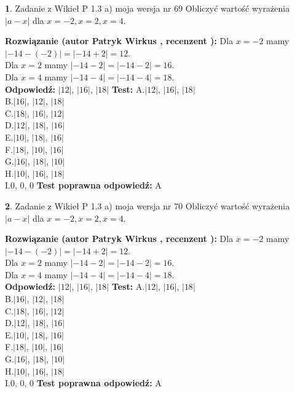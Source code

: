 \documentclass[12pt, a4paper]{article}
\theoremstyle{definition} %
\newtheorem{zad}{}
\newcommand{\zadStart}[1]{\begin{zad}#1\newline}
\newcommand{\zadStop}{\end{zad}}
\newcommand{\rozwStart}[2]{\noindent \textbf{Rozwiązanie (autor #1 , recenzent #2): }\newline}
\newcommand{\rozwStop}{\newline}
\newcommand{\odpStart}{\noindent \textbf{Odpowiedź:}\newline}
\newcommand{\odpStop}{\newline}
\newcommand{\testStart}{\noindent \textbf{Test:}\newline}
\newcommand{\testStop}{\newline}
\newcommand{\kluczStart}{\noindent \textbf{Test poprawna odpowiedź:}\newline}
\newcommand{\kluczStop}{\newline}
\begin{document}
\zadStart{Zadanie z Wikieł P 1.3 a) moja wersja nr 69}
Obliczyć wartość wyrażenia $|a - x|$ dla $x=-2,x=2,x=4$.
\zadStop
\rozwStart{Patryk Wirkus}{}
Dla $x = -2$ mamy $|-14 - (-2)| = |-14 + 2| = 12$.\\
Dla $x = 2$ mamy $|-14 - 2| = |-14 - 2| = 16$.\\
Dla $x = 4$ mamy $|-14 - 4| = |-14 - 4| = 18$.\\
\rozwStop
\odpStart
$|12|$, $|16|$, $|18|$
\odpStop
\testStart
A.$|12|$, $|16|$, $|18|$\\
B.$|16|$, $|12|$, $|18|$\\
C.$|18|$, $|16|$, $|12|$\\
D.$|12|$, $|18|$, $|16|$\\
E.$|10|$, $|18|$, $|16|$\\
F.$|18|$, $|10|$, $|16|$\\
G.$|16|$, $|18|$, $|10|$\\
H.$|10|$, $|16|$, $|18|$\\
I.$0$, $0$, $0$
\testStop
\kluczStart
A
\kluczStop



\zadStart{Zadanie z Wikieł P 1.3 a) moja wersja nr 70}
Obliczyć wartość wyrażenia $|a - x|$ dla $x=-2,x=2,x=4$.
\zadStop
\rozwStart{Patryk Wirkus}{}
Dla $x = -2$ mamy $|-14 - (-2)| = |-14 + 2| = 12$.\\
Dla $x = 2$ mamy $|-14 - 2| = |-14 - 2| = 16$.\\
Dla $x = 4$ mamy $|-14 - 4| = |-14 - 4| = 18$.\\
\rozwStop
\odpStart
$|12|$, $|16|$, $|18|$
\odpStop
\testStart
A.$|12|$, $|16|$, $|18|$\\
B.$|16|$, $|12|$, $|18|$\\
C.$|18|$, $|16|$, $|12|$\\
D.$|12|$, $|18|$, $|16|$\\
E.$|10|$, $|18|$, $|16|$\\
F.$|18|$, $|10|$, $|16|$\\
G.$|16|$, $|18|$, $|10|$\\
H.$|10|$, $|16|$, $|18|$\\
I.$0$, $0$, $0$
\testStop
\kluczStart
A
\kluczStop
\end{document}
